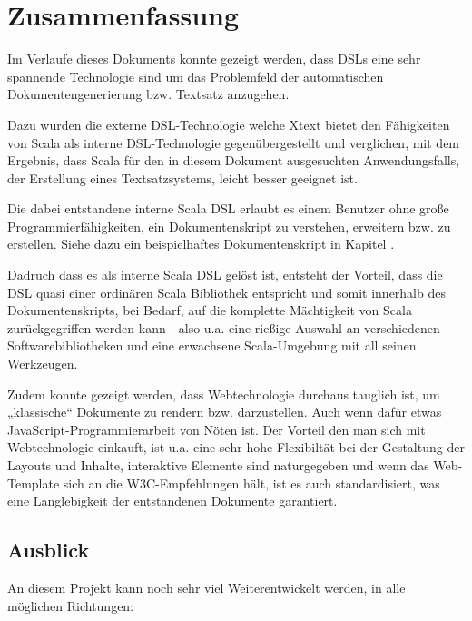 \chapter{Zusammenfassung}

Im Verlaufe dieses Dokuments konnte gezeigt werden, dass DSLs eine sehr
spannende Technologie sind um das Problemfeld der automatischen
Dokumentengenerierung bzw. Textsatz anzugehen.

Dazu wurden die externe DSL-Technologie welche Xtext bietet den Fähigkeiten
von Scala als interne DSL-Technologie gegenübergestellt und verglichen,
mit dem Ergebnis, dass Scala für den in diesem Dokument ausgesuchten
Anwendungsfalls, der Erstellung eines Textsatzsystems,
leicht besser geeignet ist.

Die dabei entstandene interne Scala DSL erlaubt es einem Benutzer ohne große Programmierfähigkeiten, ein Dokumentenskript zu verstehen, erweitern
bzw. zu erstellen.
Siehe dazu ein beispielhaftes Dokumentenskript in Kapitel \label{sec-resultat}.

Dadruch dass es als interne Scala DSL gelöst ist, entsteht der Vorteil,
dass die DSL quasi einer ordinären Scala Bibliothek entspricht und
somit innerhalb des Dokumentenskripts, bei Bedarf,
auf die komplette Mächtigkeit von Scala
zurückgegriffen werden kann---also u.a. eine rießige Auswahl an verschiedenen
Softwarebibliotheken und eine erwachsene Scala-Umgebung mit all seinen Werkzeugen.

Zudem konnte gezeigt werden, dass Webtechnologie durchaus tauglich ist, um
„klassische“ Dokumente zu rendern bzw. darzustellen. Auch wenn dafür etwas
JavaScript-Programmierarbeit von Nöten ist. Der Vorteil den man sich mit
Webtechnologie einkauft, ist u.a. eine sehr hohe Flexibiltät bei der
Gestaltung der Layouts und Inhalte, interaktive Elemente sind naturgegeben
und wenn das Web-Template sich an die W3C-Empfehlungen hält, ist es auch
standardisiert, was eine Langlebigkeit der entstandenen Dokumente garantiert.

\section{Ausblick}

An diesem Projekt kann noch sehr viel Weiterentwickelt werden, in alle
möglichen Richtungen:

